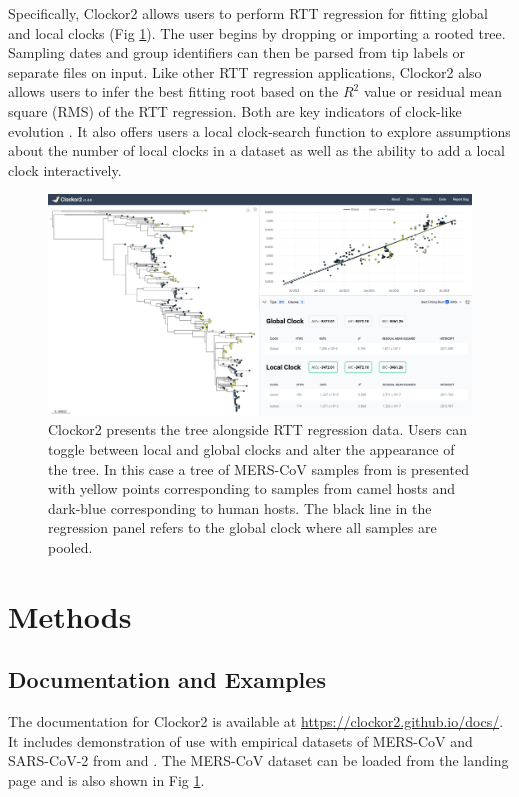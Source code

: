 \documentclass{article}
\begin{document}
Specifically, Clockor2 allows users to perform RTT regression for fitting global and local clocks (Fig \ref{fig:ui}). The user begins by dropping or importing a rooted tree. Sampling dates and group identifiers can then be parsed from tip labels or separate files on input. Like other RTT regression applications, Clockor2 also allows users to infer the best fitting root based on the $R^2$ value or residual mean square (RMS) of the RTT regression. Both are key indicators of clock-like evolution \citep{rambaut_exploring_2016,drummond_inference_2003}. It also offers users a local clock-search function to explore assumptions about the number of local clocks in a dataset as well as the ability to add a local clock interactively.

\begin{figure}[H]
\centering
\includegraphics[width = 1\linewidth]{clockor2UI.pdf}
\caption{Clockor2 presents the tree alongside RTT regression data. Users can toggle between local and global clocks and alter the appearance of the tree. In this case a tree of MERS-CoV samples from \citet{dudas_mers-cov_2018} is presented with yellow points corresponding to samples from camel hosts and dark-blue corresponding to human hosts. The black line in the regression panel refers to the global clock where all samples are pooled.}
\label{fig:ui}
\end{figure}

\section*{Methods}
\subsection*{Documentation and Examples}
The documentation for Clockor2 is available at \url{https://clockor2.github.io/docs/}. It includes demonstration of use with empirical datasets of MERS-CoV and SARS-CoV-2 from \citet{dudas_mers-cov_2018} and \citet{porter2023evolutionary}. The MERS-CoV dataset can be loaded from the landing page and is also shown in Fig \ref{fig:ui}.
\end{document}

